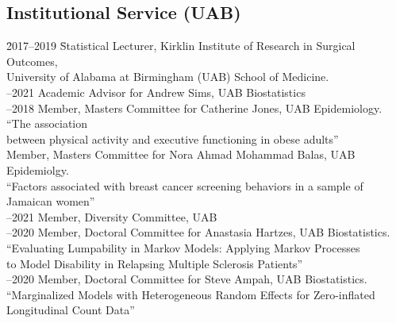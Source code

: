 \documentclass[11pt]{cv_wakeforest_article}
\newcommand{\mysubsection}[1]{\subsection*{#1}}
\begin{document}
\mysubsection{Institutional  Service (UAB)}
\begin{tabbing}
\hspace{0.25in} \= 2017--2019\hspace{0.25in} \= Statistical Lecturer, Kirklin Institute of Research in Surgical Outcomes,\\\>\>\hspace{0.25in}University of Alabama at Birmingham (UAB) School of Medicine.\\

--2021 \>Academic Advisor for Andrew Sims, UAB Biostatistics \\

--2018 \>Member, Masters Committee for Catherine Jones, UAB Epidemiology. ``The association\\\>\>\hspace{0.25in}between physical activity and executive functioning in obese adults'' \\

 \>Member, Masters Committee for Nora Ahmad Mohammad Balas, UAB Epidemiolgy.\\\>\>\hspace{0.25in}``Factors associated with breast cancer screening behaviors in a sample of\\\>\>\hspace{0.275in} Jamaican women'' \\

--2021 \>Member, Diversity Committee, UAB \\

--2020 \>Member, Doctoral Committee for Anastasia Hartzes, UAB Biostatistics.\\\>\>\hspace{0.25in}``Evaluating Lumpability in Markov Models: Applying Markov Processes\\\>\>\hspace{0.275in} to Model Disability in Relapsing Multiple Sclerosis Patients'' \\


--2020 \>Member, Doctoral Committee for Steve Ampah, UAB Biostatistics.\\\>\>\hspace{0.25in}``Marginalized Models with Heterogeneous Random Effects for Zero-inflated\\\>\>\hspace{0.275in} Longitudinal Count Data'' \\


\end{tabbing}
\end{document}
